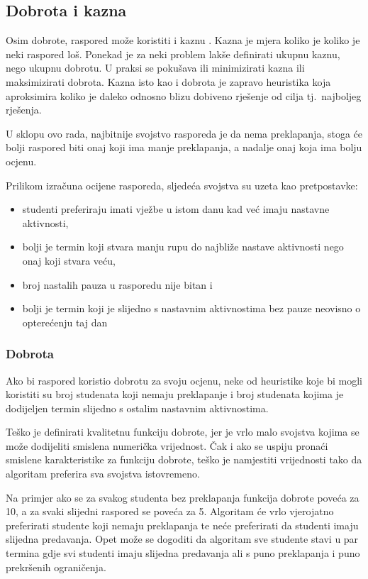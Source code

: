 \documentclass[times, utf8, zavrsni]{fer}
\begin{document}
\subsection{Dobrota i kazna}

Osim dobrote, raspored može koristiti i kaznu . Kazna je mjera koliko je koliko je neki raspored loš. Ponekad je za neki problem lakše definirati ukupnu kaznu, nego ukupnu dobrotu. U praksi se pokušava ili minimizirati kazna ili maksimizirati dobrota. Kazna isto kao i dobrota je zapravo heuristika koja aproksimira koliko je daleko odnosno blizu dobiveno rješenje od cilja tj.\ najboljeg rješenja.

U sklopu ovo rada, najbitnije svojstvo rasporeda je da nema preklapanja, stoga će bolji raspored biti onaj koji ima manje preklapanja, a nadalje onaj koja ima bolju ocjenu.

Prilikom izračuna ocijene rasporeda, sljedeća svojstva su uzeta kao pretpostavke:

\begin{itemize}
	\item studenti preferiraju imati vježbe u istom danu kad već imaju nastavne aktivnosti,
	\item bolji je termin koji stvara manju rupu do najbliže nastave aktivnosti nego onaj koji stvara veću,
	\item broj nastalih pauza u rasporedu nije bitan i 
	\item bolji je termin koji je slijedno s nastavnim aktivnostima bez pauze neovisno o opterećenju taj dan
\end{itemize}

\subsubsection{Dobrota}

Ako bi raspored koristio dobrotu za svoju ocjenu, neke od heuristike koje bi mogli koristiti su broj studenata koji nemaju preklapanje i broj studenata kojima je dodijeljen termin slijedno s ostalim nastavnim aktivnostima.

Teško je definirati kvalitetnu funkciju dobrote, jer je vrlo malo svojstva kojima se može dodijeliti smislena numerička vrijednost. Čak i ako se uspiju pronaći smislene karakteristike za funkciju dobrote, teško je namjestiti vrijednosti tako da algoritam preferira sva svojstva istovremeno.

Na primjer ako se za svakog studenta bez preklapanja funkcija dobrote poveća za 10, a za svaki slijedni raspored se poveća za 5. Algoritam će vrlo vjerojatno preferirati studente koji nemaju preklapanja te neće preferirati da studenti imaju slijedna predavanja. Opet može se dogoditi da algoritam sve studente stavi u par termina gdje svi studenti imaju slijedna predavanja ali s puno preklapanja i puno prekršenih ograničenja.
\end{document}
